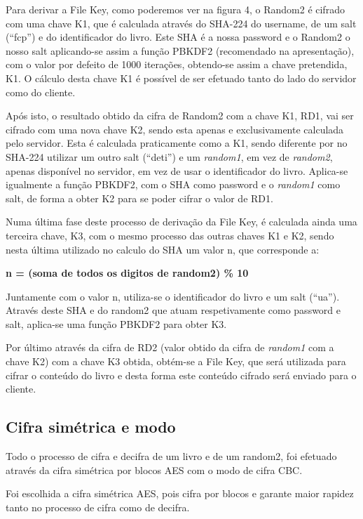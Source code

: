 \documentclass[pdftex,12pt,a4paper]{report}
\begin{document}
Para derivar a File Key, como poderemos ver na figura 4, o Random2 é cifrado com uma chave K1, que é calculada através do SHA-224 do username, de um salt (“fcp”) e do identificador do livro. Este SHA é a nossa password e o Random2 o nosso salt aplicando-se assim a função PBKDF2 (recomendado na apresentação), com o valor por defeito de 1000 iterações, obtendo-se assim a chave pretendida, K1. O cálculo desta chave K1 é possível de ser efetuado tanto do lado do servidor como do cliente.

Após isto, o resultado obtido da cifra de Random2 com a chave K1, RD1, vai ser cifrado com uma nova chave K2, sendo esta apenas e exclusivamente calculada pelo servidor. Esta é calculada praticamente como a K1, sendo diferente por no SHA-224 utilizar um outro salt (“deti”) e um \textit{random1}, em vez de \textit{random2}, apenas disponível no servidor, em vez de usar o identificador do livro. Aplica-se igualmente a função PBKDF2, com o SHA como password e o \textit{random1} como salt, de forma a obter K2 para se poder cifrar o valor de RD1.

Numa última fase deste processo de derivação da File Key, é calculada ainda uma terceira chave, K3, com o mesmo processo das outras chaves K1 e K2, sendo nesta última utilizado no calculo do SHA um valor n, que corresponde a:

\begin{center}
	\textbf{n = (soma de todos os digitos de random2) \% 10}
\end{center}

Juntamente com o valor n, utiliza-se o identificador do livro e um salt (“ua”). Através deste SHA e do random2 que atuam respetivamente como password e salt, aplica-se uma função PBKDF2 para obter K3.

Por último através da cifra de RD2 (valor obtido da cifra de \textit{random1} com a chave K2) com a chave K3 obtida, obtém-se a File Key, que será utilizada para cifrar o conteúdo do livro e desta forma este conteúdo cifrado será enviado para o cliente.

\subsection{Cifra simétrica e modo}

Todo o processo de cifra e decifra de um livro e de um random2, foi efetuado através da cifra simétrica por blocos AES com o modo de cifra CBC.

Foi escolhida a cifra simétrica AES, pois cifra por blocos e garante maior rapidez tanto no processo de cifra como de decifra.
	
\end{document}
